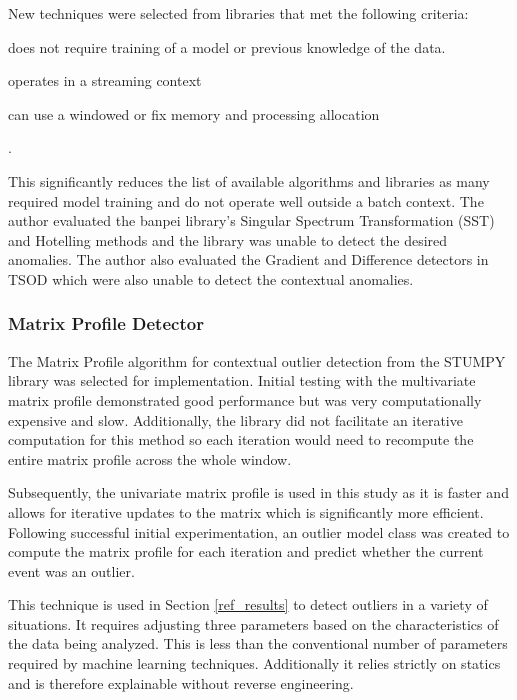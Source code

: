 New techniques were selected from libraries that met the following criteria:
\begin{inlinelist}
    \item does not require training of a model or previous knowledge of the data.
    \item operates in a streaming context
    \item can use a windowed or fix memory and processing allocation
\end{inlinelist}.

This significantly reduces the list of available algorithms and libraries as many required model training and do not operate well outside a batch context. The author evaluated the banpei \parencite{banpei} library's Singular Spectrum Transformation (SST) and Hotelling methods and the library was unable to detect the desired anomalies. The author also evaluated the Gradient and Difference detectors in TSOD \parencite{tsod} which were also unable to detect the contextual anomalies.

\subsubsection{Matrix Profile Detector}
\label{ref_matrix_profile_detector}

The Matrix Profile algorithm for contextual outlier detection from the STUMPY library \parencite{law2019stumpy} was selected for implementation. Initial testing with the multivariate matrix profile demonstrated good performance but was very computationally expensive and slow. Additionally, the library did not facilitate an iterative computation for this method so each iteration would need to recompute the entire matrix profile across the whole window.

Subsequently, the univariate matrix profile is used in this study as it is faster and allows for iterative updates to the matrix which is significantly more efficient. Following successful initial experimentation, an outlier model class was created to compute the matrix profile for each iteration and predict whether the current event was an outlier.

This technique is used in Section \ref{ref_results} to detect outliers in a variety of situations. It requires adjusting three parameters based on the characteristics of the data being analyzed. This is less than the conventional number of parameters required by machine learning techniques. Additionally it relies strictly on statics and is therefore explainable without reverse engineering.


